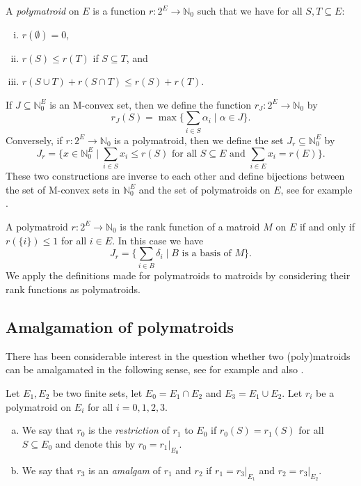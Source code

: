 \documentclass[11pt]{article}
\theoremstyle{definition}
\numberwithin{equation}{section}
\newcommand{\N}{{\mathbb N}}
\begin{document}
\begin{Def}
    A \emph{polymatroid} on $E$ is a function $r\colon 2^E\to\N_0$ such that we have for all $S,T\subseteq E$:
            \begin{enumerate}[(i)]
            \item $r(\emptyset)=0$,
                \item $r(S)\leq r(T)$ if $S\subseteq T$, and
                \item $r(S\cup T)+r(S\cap T)\leq r(S)+r(T)$.
            \end{enumerate}
\end{Def}
If $J\subseteq\N_0^E$ is an M-convex set, then we define the function $r_J\colon2^E\to\N_0$ by
    \begin{equation*}
        r_J(S)=\max\{\sum_{i\in S}\alpha_i\mid \alpha\in J\}.
    \end{equation*}
Conversely, if $r\colon 2^E\to\N_0$ is a polymatroid, then we define the set $J_r\subseteq\N_0^E$ by
\begin{equation*}
    J_r=\{x\in\N_0^E\mid \sum_{i\in S}x_i\leq r(S)\textrm{ for all }S\subseteq E\textrm{ and }\sum_{i\in E}x_i=r(E)\}.
\end{equation*}
These two constructions are inverse to each other and define bijections between the set of M-convex sets in $\N_0^E$ and the set of polymatroids on $E$, see for example \cite[\S4.4]{murota}.

\begin{rem}
    A polymatroid $r\colon 2^E\to\N_0$ is the rank function of a matroid $M$ on $E$ if and only if $r(\{i\})\leq1$ for all $i\in E$. In this case we have
    \begin{equation*}
        J_r=\{\sum_{i\in B}\delta_i\mid B\textrm{ is a basis of }M\}.
    \end{equation*}
    We apply the definitions made for polymatroids to matroids by considering their rank functions as polymatroids.
\end{rem}

\subsection{Amalgamation of polymatroids}
There has been considerable interest in the question whether two (poly)matroids can be amalgamated in the following sense, see for example \cite{sticky,stickypolymatroids} and also \cite[\S11.4]{oxley}.
\begin{Def}\label{def:amal}
    Let $E_1,E_2$ be two finite sets, let $E_0=E_1\cap E_2$ and $E_3=E_1\cup E_2$. Let $r_i$ be a polymatroid on $E_i$ for all $i=0,1,2,3$.
    \begin{enumerate}[(a)]
        \item We say that $r_0$ is the \emph{restriction} of $r_1$ to $E_0$ if $r_0(S)=r_1(S)$ for all $S\subseteq E_0$ and denote this by $r_0=r_1|_{E_0}$.
        \item We say that $r_3$ is an \emph{amalgam} of $r_1$ and $r_2$ if $r_1=r_3|_{E_1}$ and $r_2=r_3|_{E_2}$.
    \end{enumerate}
\end{Def}
\end{document}
